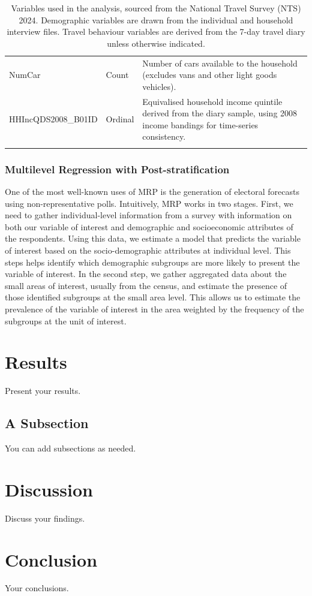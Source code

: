 \documentclass[11pt,a4paper]{article}
\begin{document}
\begin{longtable}{>{\ttfamily\small}p{4.8cm} >{\small}p{2.4cm} >{\RaggedRight\small}p{6.6cm}}
NumCar
  & Count
  & Number of cars available to the household
    (excludes vans and other light goods vehicles). \\[4pt]

HHIncQDS2008\_B01ID
  & Ordinal
  & Equivalised household income quintile derived
    from the diary sample, using 2008 income bandings
    for time-series consistency. \\[4pt]

\caption{Variables used in the analysis, sourced from the National Travel Survey (NTS) 2024.
         Demographic variables are drawn from the individual and household interview files.
         Travel behaviour variables are derived from the 7-day travel diary unless
         otherwise indicated.}
\label{tab:demo_variables}
\end{longtable}

\subsubsection{Multilevel Regression with Post-stratification}



One of the most well-known uses of MRP is the generation of electoral forecasts using non-representative polls. Intuitively, MRP works in two stages. First, we need to gather individual-level information from a survey with information on both our variable of interest and demographic and socioeconomic attributes of the respondents. Using this data, we estimate a model that predicts the variable of interest based on the socio-demographic attributes at individual level. This steps helps identify which demographic subgroups are more likely to present the variable of interest. In the second step, we gather aggregated data about the small areas of interest, usually from the census, and estimate the presence of those identified subgroups at the small area level. This allows us to estimate the prevalence of the variable of interest in the area weighted by the frequency of the subgroups at the unit of interest.

\section{Results}
Present your results.

\subsection{A Subsection}
You can add subsections as needed.

\section{Discussion}
Discuss your findings.

\section{Conclusion}
Your conclusions.



\end{document}
